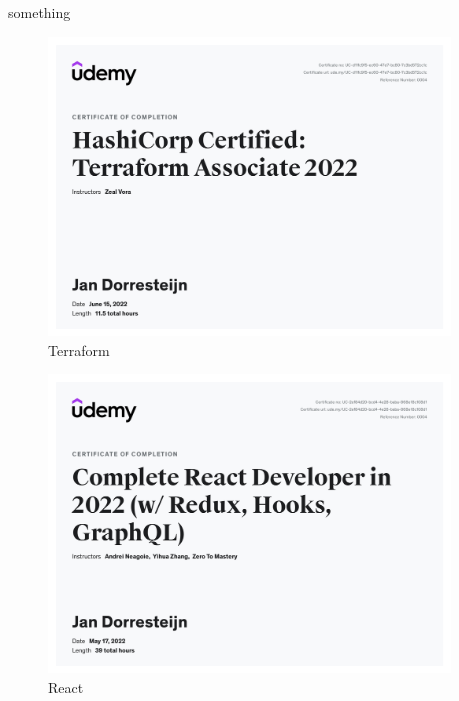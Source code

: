 {{		{
			something
		}
	}
	{%
		\begin{figure}
			\begin{center}
				\includegraphics[width=0.95\textwidth]{images/terra.jpg}
			\end{center}
			\caption{Terraform}
			\label{fig:terraform}
		\end{figure}
		\begin{figure}
			\begin{center}
				\includegraphics[width=0.95\textwidth]{images/react.jpg}
			\end{center}
			\caption{React}
			\label{fig:react}
		\end{figure}
		\begin{figure}
			\begin{center}

\end{center}
\end{figure}}}

